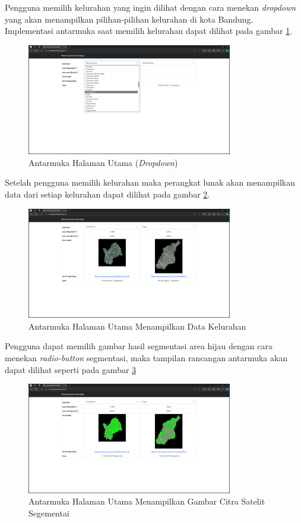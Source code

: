 Pengguna  memilih kelurahan yang ingin dilihat dengan cara menekan \textit{dropdown} yang akan menampilkan pilihan-pilihan kelurahan di kota Bandung. Implementasi antarmuka saat memilih kelurahan dapat dilihat pada  gambar \ref{fig:home2}.
\begin{figure}[H]
	\centering
	\includegraphics[width=0.8\textwidth]{Gambar/home2new.png}
	\caption{Antarmuka Halaman Utama (\textit{Dropdown})}
	\label{fig:home2}
\end{figure} 
Setelah pengguna memilih kelurahan maka perangkat lunak akan menampilkan data dari setiap kelurahan dapat dilihat pada gambar \ref{fig:home3}.
\begin{figure}[H]
	\centering
	\includegraphics[width=0.8\textwidth]{Gambar/home3new.png}
	\caption{Antarmuka Halaman Utama Menampilkan Data Kelurahan}
	\label{fig:home3}
\end{figure} 
Pengguna dapat memilih gambar hasil segmentasi area hijau dengan cara menekan \textit{radio-button} segmentasi,  maka tampilan rancangan antarmuka akan dapat dilihat seperti pada gambar \ref{fig:home5}
\begin{figure}[H]
	\centering
	\includegraphics[width=0.8\textwidth]{Gambar/home5new.png}
	\caption{Antarmuka Halaman Utama Menampilkan Gambar Citra Satelit Segementai}
	\label{fig:home5}
\end{figure} 

